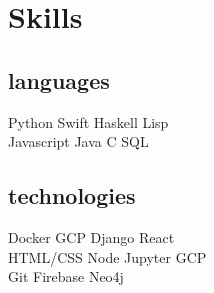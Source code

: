 \documentclass[]{houston-ethan-resume}
\begin{document}
\begin{minipage}[t]{0.33\textwidth}
%
%

\section{Skills}
\subsection{languages}
	Python \textbullet{}
	Swift \textbullet{}
	Haskell \textbullet{}
	Lisp \\
    Javascript \textbullet{} 
	Java \textbullet{}
	C \textbullet{}
	SQL
\sectionsep

\subsection{technologies}
	Docker \textbullet{}
    GCP \textbullet{}
	Django \textbullet{}
	React \\ 
	HTML/CSS \textbullet{}
	Node \textbullet{}
    Jupyter \textbullet{} 
	GCP \\ 
    Git \textbullet{}
	Firebase \textbullet{}
	Neo4j  \textbullet{}

\sectionsep

%
%

\end{minipage}
\hfill
\end{document}
